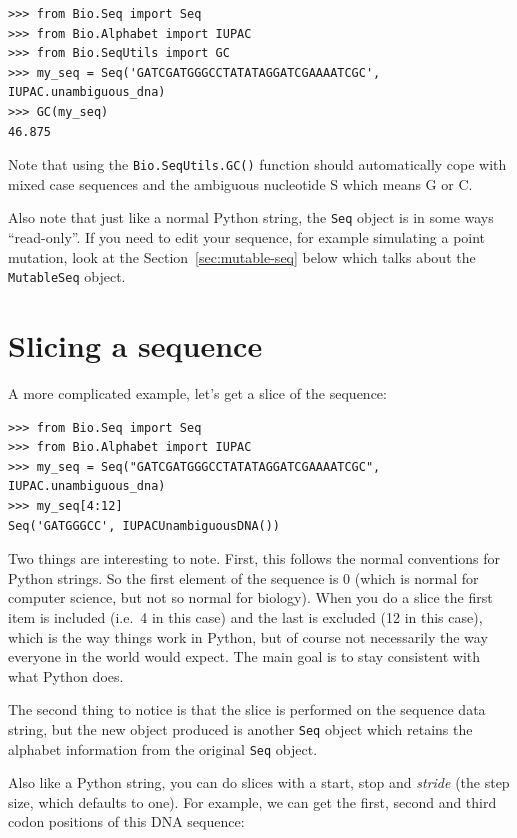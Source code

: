 \documentclass{report}
\begin{document}
\begin{verbatim}
>>> from Bio.Seq import Seq
>>> from Bio.Alphabet import IUPAC
>>> from Bio.SeqUtils import GC
>>> my_seq = Seq('GATCGATGGGCCTATATAGGATCGAAAATCGC', IUPAC.unambiguous_dna)
>>> GC(my_seq)
46.875
\end{verbatim}

\noindent Note that using the \verb|Bio.SeqUtils.GC()| function should automatically cope with mixed case sequences and the ambiguous nucleotide S which means G or C.

Also note that just like a normal Python string, the \verb|Seq| object is in some ways ``read-only''.  If you need to edit your sequence, for example simulating a point mutation, look at the Section~\ref{sec:mutable-seq} below which talks about the \verb|MutableSeq| object.

\section{Slicing a sequence}

A more complicated example, let's get a slice of the sequence:

\begin{verbatim}
>>> from Bio.Seq import Seq
>>> from Bio.Alphabet import IUPAC
>>> my_seq = Seq("GATCGATGGGCCTATATAGGATCGAAAATCGC", IUPAC.unambiguous_dna)
>>> my_seq[4:12]
Seq('GATGGGCC', IUPACUnambiguousDNA())
\end{verbatim}

Two things are interesting to note. First, this follows the normal conventions for Python strings.  So the first element of the sequence is 0 (which is normal for computer science, but not so normal for biology). When you do a slice the first item is included (i.e.~4 in this case) and the last is excluded (12 in this case), which is the way things work in Python, but of course not necessarily the way everyone in the world would expect. The main goal is to stay consistent with what Python does.

The second thing to notice is that the slice is performed on the sequence data string, but the new object produced is another \verb|Seq| object which retains the alphabet information from the original \verb|Seq| object.

Also like a Python string, you can do slices with a start, stop and \emph{stride} (the step size, which defaults to one).  For example, we can get the first, second and third codon positions of this DNA sequence:
\end{document}
